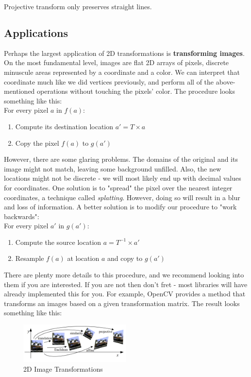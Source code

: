 \documentclass{article}
\begin{document}
Projective transform only preserves straight lines.

\subsection{Applications}
Perhaps the largest application of 2D transformations is \textbf{transforming images}. On the most fundamental level, images are flat 2D arrays of pixels, discrete minuscule areas represented by a coordinate and a color. We can interpret that coordinate much like we did vertices previously, and perform all of the above-mentioned operations without touching the pixels' color. The procedure looks something like this:\\

For every pixel $a$ in $f(a)$:
\begin{enumerate}
\item Compute its destination location $a' = T\times a$
\item Copy the pixel $f(a)$ to $g(a')$
\end{enumerate}

However, there are some glaring problems. The domains of the original and its image might not match, leaving some background unfilled. Also, the new locations might not be discrete - we will most likely end up with decimal values for coordinates. One solution is to "spread" the pixel over the nearest integer coordinates, a technique called \textit{splatting}. However, doing so will result in a blur and loss of information. A better solution is to modify our procedure to "work backwards":\\

For every pixel $a'$ in $g(a')$:
\begin{enumerate}
\item Compute the source location $a = T^{-1}\times a'$
\item Resample $f(a)$ at location $a$ and copy to $g(a')$
\end{enumerate}

There are plenty more details to this procedure, and we recommend looking into them if you are interested. If you are not then don't fret - most libraries will have already implemented this for you. For example, OpenCV provides a method that transforms an images based on a given transformation matrix. The result looks something like this:

\begin{figure}[!htb]
    \begin{center}
        \vspace{-8pt}
        \includegraphics[width=0.5\textwidth]{2d_image_transformations.png}
        \vspace{-30pt}
    \end{center}
    \caption{2D Image Transformations}
\end{figure}
\end{document}
